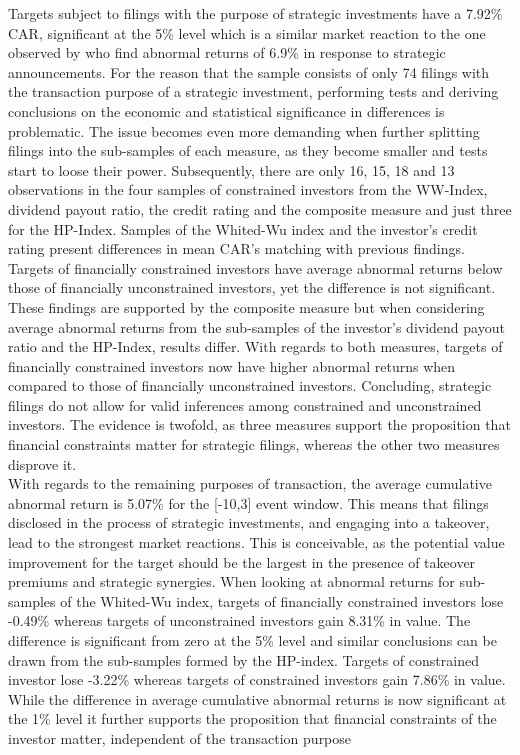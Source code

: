 \documentclass[12pt]{article}
\begin{document}
\noindent Targets subject to filings with the purpose of strategic investments have a 7.92\% CAR, significant at the 5\% level which is a similar market reaction to the one observed by \citet[p.]{Allen2000} who find abnormal returns of 6.9\% in response to strategic announcements. For the reason that the sample consists of only 74 filings with the transaction purpose of a strategic investment, performing tests and deriving conclusions on the economic and statistical significance in differences is problematic. The issue becomes even more demanding when  further splitting filings into the sub-samples of each measure, as they become smaller and tests start to loose their power. Subsequently, there are only 16, 15, 18 and 13 observations in the four samples of constrained investors from the WW-Index, dividend payout ratio, the credit rating and the composite measure and just three for the HP-Index. Samples of the Whited-Wu index and the investor's credit rating present differences in mean CAR's matching with previous findings. Targets of financially constrained investors have average abnormal returns below those of financially unconstrained investors, yet the difference is not significant. These findings are supported by the composite measure but when considering average abnormal returns from the sub-samples of the investor's dividend payout ratio and the HP-Index, results differ. With regards to both measures, targets of financially constrained investors now have higher abnormal returns when compared to those of financially unconstrained investors. Concluding, strategic filings do not allow for valid inferences among constrained and unconstrained investors. The evidence is twofold, as three measures support the proposition that financial constraints matter for strategic filings, whereas the other two measures disprove it.\\
With regards to the remaining purposes of transaction, the average cumulative abnormal return is 5.07\% for the [-10,3] event window. This means that filings disclosed in the process of strategic investments, and engaging into a takeover, lead to the strongest market reactions. This is conceivable, as the potential value improvement for the target should be the largest in the presence of takeover premiums and strategic synergies. When looking at abnormal returns for sub-samples of the Whited-Wu index, targets of financially constrained investors lose -0.49\% whereas targets of unconstrained investors gain 8.31\% in value. The difference is significant from zero at the 5\% level and similar conclusions can be drawn from the sub-samples formed by the HP-index. Targets of constrained investor lose -3.22\% whereas targets of constrained investors gain 7.86\% in value. While the difference in average cumulative abnormal returns is now significant at the 1\% level it further supports the proposition that financial constraints of the investor matter, independent of the transaction purpose\\
\end{document}
